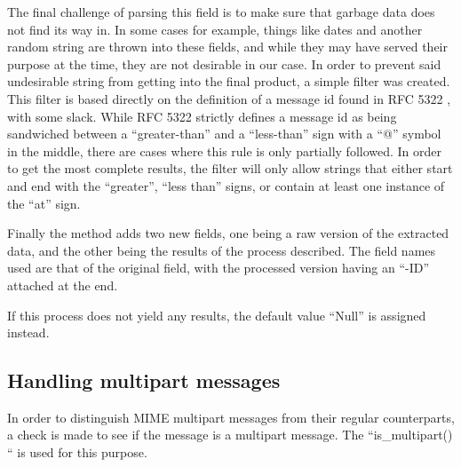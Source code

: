 \documentclass[a4paper,english]{report}
\begin{document}
\begin{center}



\end{center}


The final challenge of parsing this field is to make sure that garbage data does not find its way in.
In some cases for example, things like dates and another random string are thrown into these fields, and while they may have served their purpose at the time, they are not desirable in our case. 
In order to prevent said undesirable string from getting into the final product, a simple filter was created. This filter is based directly on the definition of a message id found in RFC 5322 \cite{RFC5322}, with some slack.
While RFC 5322 \cite{RFC5322} strictly defines a message id as being sandwiched between a “greater-than” and a “less-than”  sign with a “@” symbol in the middle, there are cases where this rule is only partially followed. In order to get the most complete results, the filter will only allow strings that either start and end with the “greater”, “less than” signs, or contain at least one instance of the “at” sign.  

\begin{center}



\end{center}

Finally the method adds two new fields, one being a raw version of the extracted data, and the other being the results of the process described. The field names used are that of the original field, with the processed version having an “-ID” attached at the end. 


\begin{center}



\end{center}

If this process does not yield any results, the default value “Null” is assigned instead. 

\subsection{Handling multipart messages}

In order to distinguish MIME multipart messages from their regular counterparts, a check is made to see if the message is a multipart message. The “is\_multipart() “ is used for this purpose.\\
\end{document}
